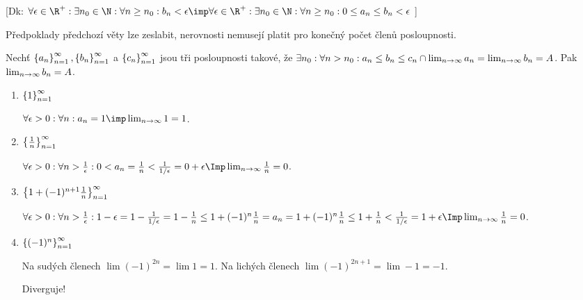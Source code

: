 [Dk: $
\forall \epsilon\in\R^+:\exists n_0\in \N: \forall n\ge n_0: b_n<\epsilon
\imp 
\forall \epsilon\in\R^+:\exists n_0\in \N: \forall n\ge n_0: 0\le a_n\le b_n<\epsilon$
]

\Poz Předpoklady předchozí věty lze zeslabit, nerovnosti nemusejí platit pro konečný počet
členů posloupnosti. 

Nechť $\left\{{a_n}\right\}_{n=1}^{\infty},\left\{{b_n}\right\}_{n=1}^{\infty}$ a $\left\{{c_n}\right\}_{n=1}^{\infty}$ jsou tři posloupnosti takové, že
$\exists n_0:\forall n>n_0: a_n\le b_n \le c_n \cap \lim_{n\rightarrow\infty} a_n = \lim_{n\rightarrow\infty} b_n =A$.
Pak $\lim_{n\rightarrow\infty} b_n = A$.

\Pr
\begin{enumerate}
	\item $\left\{{1}\right\}_{n=1}^{\infty}$

		$\forall \epsilon >0 : \forall n: a_n=1 \imp \li{1}=1$.
	\item $\left\{{\frac 1 n}\right\}_{n=1}^{\infty}$

		$\forall \epsilon>0:\forall n >\f1\epsilon: 0 < a_n = \f 1 n < \f 1{1/\epsilon} = 0+ \epsilon \Imp \li{\f 1 n} = 0$.
	\item $\left\{{1+(-1)^{n+1}\frac 1 n}\right\}_{n=1}^{\infty}$

		$\forall \epsilon>0:\forall n >\f1\epsilon: 1-\epsilon = 1-\f 1 {1/\epsilon} = 1-\f 1 n \le 1+(-1)^n \f 1 n=a_n=1+(-1)^n \f 1 n \le 1+\f 1 n< \f 1{1/\epsilon} = 1+ \epsilon \Imp \li{\f 1 n} = 0$.
	\item $\left\{{(-1)^n}\right\}_{n=1}^{\infty}$

		Na sudých členech $\lim (-1)^{2n} = \lim 1 = 1$.
		Na lichých členech $\lim (-1)^{2n+1} = \lim -1 = -1$.

		Diverguje!

\end{enumerate}



\EndDoc
